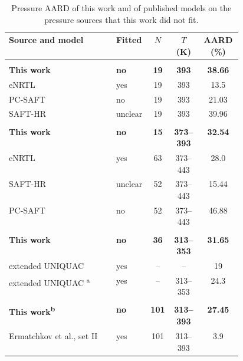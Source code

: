 \begin{table}[!htbp]\small\setlength{\tabcolsep}{2pt}\caption{Pressure AARD of this work and of published models on the pressure sources that this work did not fit.}\label{tab:supplement-published-models}
\begin{tabular}{@{}>{\raggedright\arraybackslash}p{0.46\linewidth}lccS[table-format=2.2,detect-weight]@{}}
\toprule Source and model & Fitted & $N$ & $T$ (K) & {AARD (\%)} \\ \midrule
\addlinespace{} \\*
\bfseries \quad This work & \bfseries no & \bfseries 19 & \bfseries 393 & \bfseries 38.66 \\
\quad eNRTL \cite{Zhang2011} & yes & 19 & 393 & 13.5 \\
\quad PC-SAFT \cite{Baygi2015} & no & 19 & 393 & 21.03 \\
\quad SAFT-HR \cite{Najafloo2018} & unclear & 19 & 393 & 39.96 \\
\addlinespace{} \\*
\bfseries \quad This work & \bfseries no & \bfseries 15 & \bfseries 373--393 & \bfseries 32.54 \\
\quad eNRTL \cite{Zhang2011} & yes & 63 & 373--443 & 28.0 \\
\quad SAFT-HR \cite{Najafloo2018} & unclear & 52 & 373--443 & 15.44 \\
\quad PC-SAFT \cite{Baygi2015} & no & 52 & 373--443 & 46.88 \\
\addlinespace{} \\*
\bfseries \quad This work & \bfseries no & \bfseries 36 & \bfseries 313--353 & \bfseries 31.65 \\
\quad extended UNIQUAC \cite{bigetDevelopmentThermodynamicIdentification2015a} & yes & -- & -- & 19 \\
\quad extended UNIQUAC \cite{Aronu2011}\textsuperscript{a} & yes & -- & 313--353 & 24.3 \\
\addlinespace{} \\*
\bfseries \quad This work\textsuperscript{b} & \bfseries no & \bfseries 101 & \bfseries 313--393 & \bfseries 27.45 \\
\quad Ermatchkov et al., set II \cite{ermatchkovSolubilityCarbonDioxide2006} & yes & 101 & 313--393 & 3.9 \\

\end{tabular}
\end{table}
